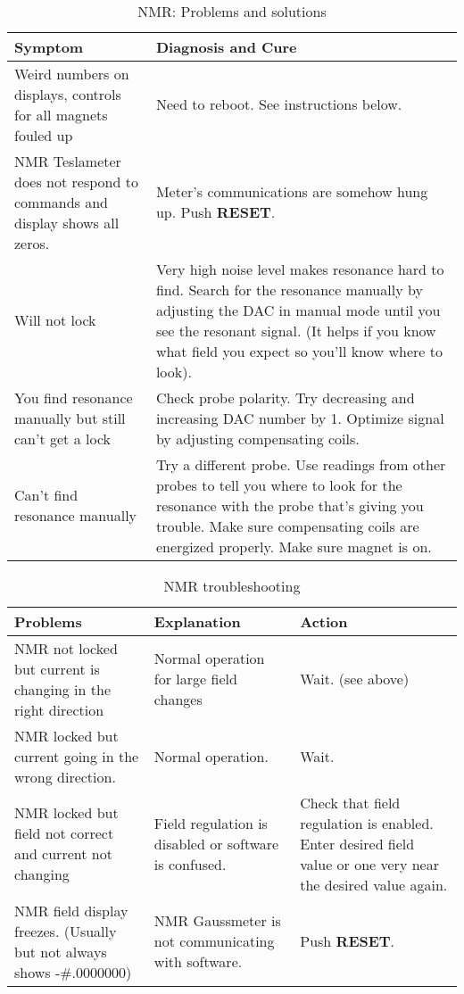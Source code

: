{\pagebreak
{}\\
\begin{table}[htb]
\begin{tabular}{|p{}|p{}|}\hline
Symptom & Diagnosis and Cure \\ \hline\hline
Weird numbers on displays, controls for all magnets fouled up 
& Need to reboot.  See instructions below. \\ \hline
NMR Teslameter does not respond to commands and display shows all zeros. 
& Meter's communications are somehow hung up. Push {\bf RESET}. \\ \hline
Will not lock 
& Very high noise level makes resonance hard to find. Search for the resonance manually by 
  adjusting the DAC in manual mode until you see the resonant signal.  (It helps if you know 
  what field you expect so you'll know where to look). \\ \hline
You find resonance manually but still can't get a lock 
& Check probe polarity. Try decreasing and increasing DAC number by 1. Optimize signal 
  by adjusting compensating coils. \\ \hline
Can't find resonance manually 
& Try a different probe.  Use readings from other probes to tell you where to look for 
 the resonance with the probe that's giving you trouble.  Make sure
 compensating coils are energized properly.  Make sure magnet is on. \\ \hline\hline
\end{tabular}
\caption[NMR: Problems and solutions]{NMR: Problems and solutions}
\label{tab:nmr-problems-solutions}
\end{table}

\begin{table}[ht]
\begin{center}
\begin{tabular}{|p{}|p{}|p{}|}\hline
Problems & Explanation & Action \\ \hline
NMR not locked but current is changing in the right direction 
& Normal operation for large field changes  
& Wait. (see above) \\ \hline
NMR locked but current going in the wrong direction.
& Normal operation. 
& Wait. \\ \hline
NMR locked but field not correct and current not changing 
& Field regulation is disabled or software is confused.
& Check that field regulation is enabled. Enter desired field value or one
  very near the desired value again. \\ \hline
NMR field display freezes. (Usually but not always shows  -\#.0000000)
& NMR Gaussmeter is not communicating with software.
& Push {\bf RESET}. \\ \hline
\end{tabular}
\end{center}
\caption[NMR troubleshooting]{NMR troubleshooting
}
\label{tab:hrs_nmr_2}
\end{table}

} %

